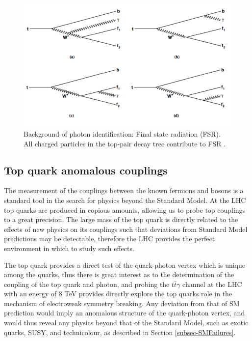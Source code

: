 \begin{figure} [h!]
\begin{center}
\includegraphics[width=\textwidth]{Figures/BackgroundFSR.png}
\end{center}
\caption{Background of photon identification: Final state radiation (FSR). All charged particles in the top-pair decay tree contribute to FSR \cite{photonbackgrounds}.}
\label{fig-BackgroundFSR}
\end{figure}


\subsection{Top quark anomalous couplings}

The measurement of the couplings between the known fermions and bosons is a standard tool in the search for physics beyond the Standard Model. At the LHC top quarks are produced in copious amounts, allowing us to probe top couplings to a great precision. The large mass of the top quark is directly related to the effects of new physics on its couplings such that deviations from Standard Model predictions may be detectable, therefore the LHC provides the perfect environment in which to study such effects.

The top quark provides a direct test of the quark-photon vertex which is unique among the quarks, thus there is great interest as to the determination of the coupling of the top quark and photon, and probing the $t\bar{t}\gamma$ channel at the LHC with an energy of 8 TeV provides directly explore the top quarks role in the mechanism of electroweak symmetry breaking. Any deviation from that of SM prediction would imply an anomalous structure of the quark-photon vertex, and would thus reveal any physics beyond that of the Standard Model, such as exotic quarks, SUSY, and technicolour, as described in Section \ref{subsec-SMFailures}. 

